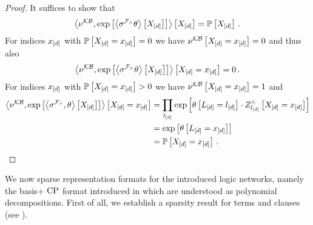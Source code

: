 \begin{proof}
    It suffices to show that
    \[ \left\langle \nu^{\mathcal{KB}}, \mathrm{exp}\left[\left\langle 
        \sigma^{\mathcal{F}_{\land}}\theta
    \right\rangle \left[ 
        X_{[d]}
     \right]\right]\right\rangle \left[ X_{[d]} \right] = \mathbb{P}\left[X_{[d]}\right] \, . \]
    For indices $x_{[d]}$ with $\mathbb{P}\left[X_{[d]}=x_{[d]}\right]=0$ we have $\nu^{\mathcal{KB}}\left[X_{[d]}=x_{[d]}\right]=0$ and thus also
    \[ \left\langle \nu^{\mathcal{KB}}, \mathrm{exp}\left[\left\langle 
        \sigma^{\mathcal{F}_{\land}}\theta
    \right\rangle \left[ 
        X_{[d]}
     \right]\right]\right\rangle \left[ X_{[d]}=x_{[d]} \right] = 0 \, . \]
    For indices $x_{[d]}$ with $\mathbb{P}\left[X_{[d]}=x_{[d]}\right]>0$ we have $\nu^{\mathcal{KB}}\left[X_{[d]}=x_{[d]}\right]=1$ and
    \begin{align*}
        \left\langle \nu^{\mathcal{KB}}, \mathrm{exp}\left[\left\langle 
            \sigma^{\mathcal{F}_{\land}},\theta
        \right\rangle \left[ 
            X_{[d]}
         \right]\right]\right\rangle \left[ X_{[d]}=x_{[d]} \right]
        &= \prod_{l_{[d]}} \mathrm{exp}\left[\theta\left[L_{[d]}=l_{[d]}\right] \cdot Z^{\land}_{l_{[d]}}\left[X_{[d]}=x_{[d]}\right]\right] \\
        &=  \mathrm{exp}\left[\theta\left[L_{[d]}=x_{[d]}\right]\right] \\
        &=  \mathbb{P}\left[X_{[d]}=x_{[d]}\right] \, .
    \end{align*}
\end{proof}




We now sparse representation formats for the introduced logic networks, namely the basis+ $\mathrm{CP}$ format introduced in  which are understood as polynomial decompositions.
First of all, we establish a sparsity result for terms and clauses (see ).

